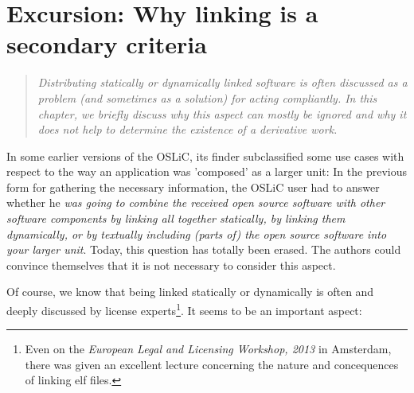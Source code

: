 %
%
%
%
%



\section{Excursion: Why linking is a secondary criteria}
\label{sec:LinkingSecondary}
\footnotesize
\begin{quote}\itshape
Distributing statically or dynamically linked software is often discussed as a
problem (and sometimes as a solution) for acting compliantly. In this chapter,
we briefly discuss why this aspect can mostly be ignored and why it does not
help to determine the existence of a derivative work.
\end{quote}
\normalsize

In some earlier versions of the OSLiC, its finder subclassified some use cases
with respect to the way an application was 'composed' as a larger unit: In the
previous form for gathering the necessary information, the OSLiC user had to
answer whether he \emph{was going to combine the received open source software
with other software components by linking all together statically, by linking
them dynamically, or by textually including (parts of) the open source software
into your larger unit}. Today, this question has totally been erased. The
authors could convince themselves that it is not necessary to consider this
aspect.

Of course, we know that being linked statically or dynamically is often and
deeply discussed by license experts\footnote{Even on the \emph{European Legal
and Licensing Workshop, 2013} in Amsterdam, there was given an excellent lecture
concerning the nature and concequences of linking elf files.}. It seems to be an
important aspect:

